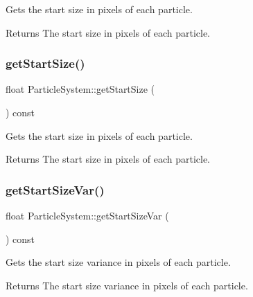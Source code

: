 Gets the start size in pixels of each particle.

\begin{DoxyReturn}{Returns}
The start size in pixels of each particle. 
\end{DoxyReturn}
\mbox{\label{classParticleSystem_a31d1b7bd256455093c2edd2a560c9684}} 
\subsubsection{\texorpdfstring{get\+Start\+Size()}{getStartSize()}\hspace{0.1cm}{\footnotesize\ttfamily [2/2]}}
{\footnotesize\ttfamily float Particle\+System\+::get\+Start\+Size (\begin{DoxyParamCaption}{ }\end{DoxyParamCaption}) const\hspace{0.3cm}{\ttfamily [inline]}}

Gets the start size in pixels of each particle.

\begin{DoxyReturn}{Returns}
The start size in pixels of each particle. 
\end{DoxyReturn}
\mbox{\label{classParticleSystem_a1269b84f6f3b4355fb2df725ff1131f3}} 
\subsubsection{\texorpdfstring{get\+Start\+Size\+Var()}{getStartSizeVar()}\hspace{0.1cm}{\footnotesize\ttfamily [1/2]}}
{\footnotesize\ttfamily float Particle\+System\+::get\+Start\+Size\+Var (\begin{DoxyParamCaption}{ }\end{DoxyParamCaption}) const\hspace{0.3cm}{\ttfamily [inline]}}

Gets the start size variance in pixels of each particle.

\begin{DoxyReturn}{Returns}
The start size variance in pixels of each particle. 
\end{DoxyReturn}
\mbox{\label{classParticleSystem_a1269b84f6f3b4355fb2df725ff1131f3}} 
